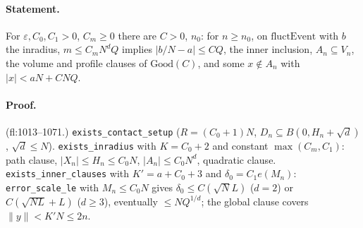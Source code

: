 \paragraph{Statement.} For $\varepsilon,C_0,C_1>0$, $C_m\geq0$ there are $C>0$, $n_0$: for $n\geq n_0$, on $\mathrm{fluctEvent}$ with $b$ the inradius, $m\leq C_mN^dQ$ implies
$|b/N-a|\leq CQ$, the inner inclusion, $A_n\subseteq V_n$, the volume and profile clauses of $\mathrm{Good}(C)$, and some $x\notin A_n$ with $|x|<aN+CNQ$.
\paragraph{Proof.} (fl:1013--1071.) \texttt{exists\_contact\_setup} ($R=(C_0+1)N$, $D_n\subseteq B(0,H_n+\sqrt d)$, $\sqrt d\leq N$). \texttt{exists\_inradius} with $K=C_0+2$ and constant
$\max(C_m,C_1)$: path clause, $|X_n|\leq H_n\leq C_0N$, $|A_n|\leq C_0N^d$, quadratic clause. \texttt{exists\_inner\_clauses} with $K'=a+C_0+3$ and $\delta_0=C_1e(M_n)$:
\texttt{error\_scale\_le} with $M_n\leq C_0N$ gives $\delta_0\leq C(\sqrt NL)$ ($d=2$) or $C(\sqrt{NL}+L)$ ($d\geq3$), eventually $\leq NQ^{1/d}$; the global clause covers $\|y\|<K'N\leq2n$.
